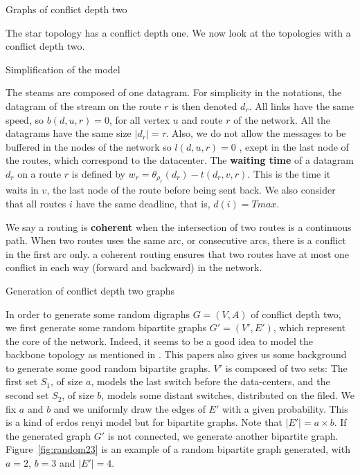 \documentclass[10pt]{article}
\begin{document}
\begin{section}{Graphs of conflict depth two}



The star topology has a conflict depth one. We now look at the topologies with a conflict depth two.
  

   \begin{subsection}{Simplification of the model}
 
   The steams are composed of one datagram. For simplicity in the notations, the datagram of the stream on the route $r$ is then denoted $d_r$. All links have the same speed, so $b(d,u,r)=0$, for all vertex $u$ and route $r$ of the network. All the datagrams have the same size $|d_r| = \tau$.
   Also, we do not allow the messages to be buffered in the nodes of the network so $l(d,u,r)=0$ , exept in the last node of the routes, which correspond to the datacenter.
   The \textbf{waiting time} of a datagram $d_r$ on a route $r$ is defined by $w_r = \theta_{\rho_r}(d_r) - t(d_r,v,r)$. This is the time it waits in $v$, the last node of the route before being sent back.
   We also consider that all routes $i$ have the same deadline, that is,  $d(i)= Tmax$.
   
   We say a routing is \textbf{coherent} when the intersection of two routes is a continuous path. When two routes uses the same arc, or consecutive arcs, there is a conflict in the first arc only. a coherent routing ensures that two routes have at most one conflict in each way (forward and backward) in the network.
  \end{subsection}
 


    \begin{subsection}{Generation of conflict depth two graphs}
    
     In order to generate some random digraphs $G=(V,A)$ of conflict depth two, we first generate some random bipartite graphs $G'=(V',E')$, which represent the core of the network. Indeed, it seems to be a good idea to model the backbone topology as mentioned in \cite{tarissan_towards_2013}. This papers also gives us some background to generate some good random bipartite graphs. 
$V'$ is composed of two sets: The first set $S_1$, of size $a$, models the last switch before the data-centers, and the second set $S_2$, of size $b$, models some distant switches, distributed on the filed. We fix $a$ and $b$ and we uniformly draw the edges of $E'$ with a given probability. This is a kind of erdos renyi model but for bipartite graphs. Note that $|E'|= a \times b$. If the generated graph  $G'$ is not connected, we generate another bipartite graph.
Figure~\ref{fig:random23} is an example of a random bipartite graph generated, with $a = 2$, $b=3$ and $|E'|=4$.


\end{subsection}
\end{section}
\end{document}
